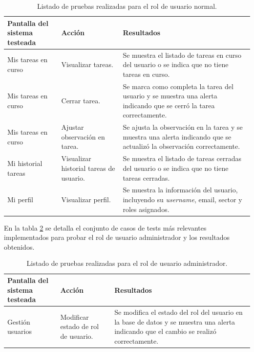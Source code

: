 \begin{table}[h]
	\centering
	\caption[Tipos de pruebas sistema]{Listado de pruebas realizadas para el rol de usuario normal.}
	\begin{tabular}{ p{3.5cm} p{2.5cm} p{7cm}}

		\toprule
		\textbf{Pantalla del sistema testeada} & 
		\textbf{Acción} & 
		\textbf{Resultados} 
		\\
		\midrule
Mis tareas en curso  & Visualizar tareas.  & Se muestra el listado de tareas en curso del usuario o se indica que no tiene tareas en curso. \\
Mis tareas en curso & Cerrar tarea.  & Se marca como completa la tarea del usuario y se muestra una alerta indicando que se cerró la tarea correctamente.  \\
Mis tareas en curso & Ajustar observación en tarea.  & Se ajusta la observación en la tarea y se muestra una alerta indicando que se actualizó la observación correctamente. \\
Mi historial tareas & Visualizar historial tareas de usuario. & Se muestra el listado de tareas cerradas del usuario o se indica que no tiene tareas cerradas. \\
Mi perfil & Visualizar perfil. & Se muestra la información del usuario, incluyendo su \textit{username}, email, sector y roles asignados. \\

		\bottomrule
		\hline
	\end{tabular}
	\label{tab:tablaTestsSistemaUsuNormal}
\end{table}


En la tabla  \ref{tab:tablaTestsSistemaUsuAdmin} se detalla el conjunto de casos de tests más relevantes implementados para probar el rol de usuario administrador y los resultados obtenidos. 

\begin{table}[h]
	\centering
	\caption[Tipos de pruebas sistema]{Listado de pruebas realizadas para el rol de usuario administrador.}
	\begin{tabular}{ p{3.5cm} p{2.5cm} p{7cm}} 	

		\toprule
		\textbf{Pantalla del sistema testeada} & 
		\textbf{Acción} & 
		\textbf{Resultados} 
		\\
		\midrule
Gestión usuarios & Modificar estado de rol de usuario.  & Se modifica el estado del rol del usuario en la base de datos y se muestra una alerta indicando que el cambio se realizó correctamente.  \\
		\bottomrule
		\hline
	\end{tabular}
	\label{tab:tablaTestsSistemaUsuAdmin}
\end{table}

